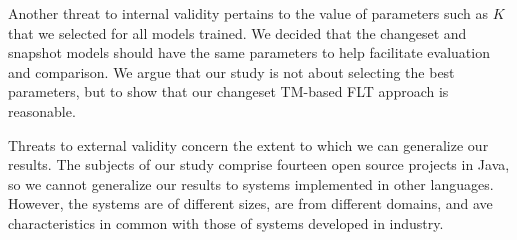 Another threat to internal validity pertains to the value of parameters such as $K$ that we selected for all models trained.
We decided that the changeset and snapshot models should have the same parameters to help facilitate evaluation and comparison.
We argue that our study is not about selecting the best parameters,
but to show that our changeset TM-based FLT approach is reasonable.

Threats to external validity concern the extent to which we can generalize our results.
The subjects of our study comprise fourteen open source projects in Java,
so we cannot generalize our results to systems implemented in other languages.
However, the systems are of different sizes, are from different domains, and
ave characteristics in common with those of systems developed in industry.

